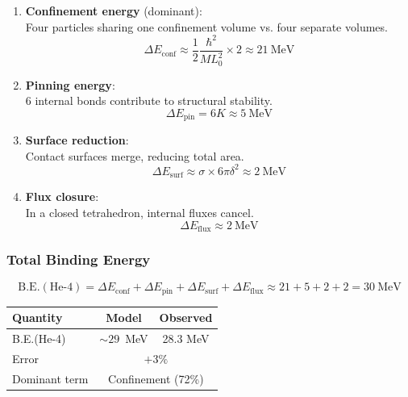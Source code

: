 \begin{enumerate}
    \item \textbf{Confinement energy} (dominant): \\
    Four particles sharing one confinement volume vs. four separate volumes.
    \begin{equation}
        \Delta E_{\text{conf}} \approx \frac{1}{2} \frac{\hbar^2}{M L_0^2} \times 2 \approx 21~\text{MeV}
    \end{equation}

    \item \textbf{Pinning energy}: \\
    6 internal bonds contribute to structural stability.
    \begin{equation}
        \Delta E_{\text{pin}} = 6K \approx 5~\text{MeV}
    \end{equation}

    \item \textbf{Surface reduction}: \\
    Contact surfaces merge, reducing total area.
    \begin{equation}
        \Delta E_{\text{surf}} \approx \sigma \times 6\pi\delta^2 \approx 2~\text{MeV}
    \end{equation}

    \item \textbf{Flux closure}: \\
    In a closed tetrahedron, internal fluxes cancel.
    \begin{equation}
        \Delta E_{\text{flux}} \approx 2~\text{MeV}
    \end{equation}
\end{enumerate}

\subsubsection{Total Binding Energy}

\begin{equation}
    \text{B.E.}(\text{He-4}) = \Delta E_{\text{conf}} + \Delta E_{\text{pin}} + \Delta E_{\text{surf}} + \Delta E_{\text{flux}} \approx 21 + 5 + 2 + 2 = 30~\text{MeV}
\end{equation}

\begin{tcolorbox}[colback=green!5!white, colframe=green!75!black, title=Result: He-4 Binding]
\begin{center}
\begin{tabular}{lcc}
\hline
Quantity & Model & Observed \\
\hline
B.E.(He-4) & $\sim 29$~MeV & 28.3 MeV \\
Error & \multicolumn{2}{c}{$+3\%$} \\
Dominant term & \multicolumn{2}{c}{Confinement (72\%)} \\
\hline
\end{tabular}
\end{center}
\end{tcolorbox}

